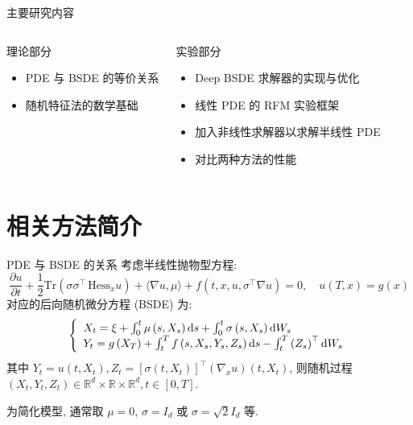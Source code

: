 \documentclass[aspectratio=169,10pt]{beamer}
\def\dif{\mathinner{\mathrm{d}}\hphantom{\mskip-\thinmuskip}}
\begin{document}
    \begin{frame}{主要研究内容}
        \begin{columns}[T]
            \begin{block}{理论部分}
                \begin{itemize}
                    \item PDE 与 BSDE 的等价关系
                    \item 随机特征法的数学基础
                \end{itemize}
            \end{block}

            \begin{block}{实验部分}
                \begin{itemize}
                    \item Deep BSDE 求解器的实现与优化
                    \item 线性 PDE 的 RFM 实验框架
                    \item 加入非线性求解器以求解半线性 PDE
                    \item 对比两种方法的性能
                \end{itemize}
            \end{block}
        \end{columns}
    \end{frame}

    \section{相关方法简介}
    \begin{frame}{PDE 与 BSDE 的关系}
        考虑半线性抛物型方程:
        \begin{equation*}
            \frac{\partial u}{\partial t} + \frac{1}{2} \mathrm{Tr}\left(\sigma\sigma^{\top}\,\mathrm{Hess}_x u\right) + \langle\nabla u, \mu\rangle + f\left(t, x, u, \sigma^{\top} \nabla u\right)=0, \quad u\left(T,x\right)=g\left(x\right)
        \end{equation*}
        对应的后向随机微分方程 (BSDE) 为:
        \begin{equation*}
            \left\{\begin{array}{l}
                X_{t} = \xi + \int_{0}^{t} \mu\left(s, X_{s}\right) \dif s + \int_{0}^{t} \sigma\left(s, X_{s}\right) \dif W_{s} \\
                Y_{t} = g\left(X_{T}\right) + \int_{t}^{T} f\left(s, X_{s}, Y_{s}, Z_{s}\right) \dif s - \int_{t}^{T} \left(Z_{s}\right)^{\top} \dif W_{s}
            \end{array}\right.
        \end{equation*}
        其中 $Y_{t} = u\left(t, X_{t}\right), Z_{t} = \left[\sigma\left(t, X_{t}\right)\right]^{\top} \left(\nabla_{x} u \right)\left(t, X_{t}\right)$, 则随机过程 $\left(X_{t}, Y_{t}, Z_{t}\right) \in \mathbb{R}^{d} \times \mathbb{R} \times \mathbb{R}^d, t \in \left[0, T\right]$.

        为简化模型, 通常取 $\mu = 0$, $\sigma = I_d$ 或 $\sigma = \sqrt{2} I_d$ 等.
    \end{frame}
\end{document}
